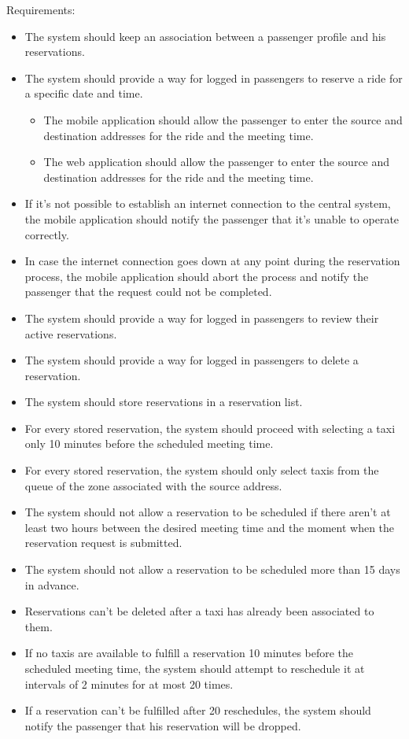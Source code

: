 Requirements:
\begin{itemize}
\item The system should keep an association between a passenger profile and his reservations.
\item The system should provide a way for logged in passengers to reserve a ride for a specific date and time.
\begin{itemize}
\item The mobile application should allow the passenger to enter the source and destination addresses for the ride and the meeting time.
\item The web application should allow the passenger to enter the source and destination addresses for the ride and the meeting time.
\end{itemize}
\item If it's not possible to establish an internet connection to the central system, the mobile application should notify the passenger that it's unable to operate correctly.
\item In case the internet connection goes down at any point during the reservation process, the mobile application should abort the process and notify the passenger that the request could not be completed.
\item The system should provide a way for logged in passengers to review their active reservations.
\item The system should provide a way for logged in passengers to delete a reservation.
\item The system should store reservations in a reservation list.
\item For every stored reservation, the system should proceed with selecting a taxi only 10 minutes before the scheduled meeting time.
\item For every stored reservation, the system should only select taxis from the queue of the zone associated with the source address.
\item The system should not allow a reservation to be scheduled if there aren't at least two hours between the desired meeting time and the moment when the reservation request is submitted. 
\item The system should not allow a reservation to be scheduled more than 15 days in advance.
\item Reservations can't be deleted after a taxi has already been associated to them.
\item If no taxis are available to fulfill a reservation 10 minutes before the scheduled meeting time, the system should attempt to reschedule it at intervals of 2 minutes for at most 20 times.
\item If a reservation can't be fulfilled after 20 reschedules, the system should notify the passenger that his reservation will be dropped. 
\end{itemize}


